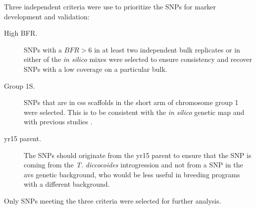 Three independent criteria were use to prioritize the SNPs for marker development and validation: 

\begin{description}
\item[High BFR.] SNPs with a $BFR>6$ in at least two independent bulk replicates or in either of the \textit{in silico} mixes were selected to ensure consistency and recover SNPs with a low coverage on a particular bulk. 
\item[Group 1S.] SNPs that are in \acrshort{css} scaffolds in the short arm of chromosome group 1 were selected.
This is to be consistent with the \textit{in silico} genetic map and with previous studies \citep{Murphy2009,Peng2000,Grama1997}.
\item[\acrshort{yr15} parent.] The SNPs should originate from the \acrshort{yr15} parent to ensure that the SNP is coming from the \textit{T. diccocoides} introgression and not from a SNP in the \acrshort{avs} genetic background, who would be less useful in breeding programs with a different background.
\end{description}

Only SNPs meeting the three criteria were selected for further analysis. 

